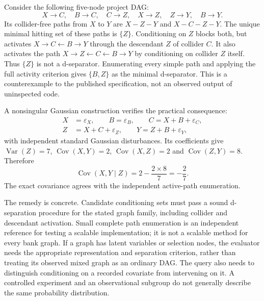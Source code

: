 Consider the following five-node project DAG:
\begin{equation}
 X\to C,\quad B\to C,\quad C\to Z,\quad X\to Z,
 \quad Z\to Y,\quad B\to Y.
\label{exec17:validity-graph}
\end{equation}
Its collider-free paths from $X$ to $Y$ are $X-Z-Y$ and $X-C-Z-Y$. The unique
minimal hitting set of these paths is $\{Z\}$. Conditioning on $Z$ blocks
both, but activates $X\to C\leftarrow B\to Y$ through the descendant
$Z$ of collider $C$. It also activates the path
$X\to Z\leftarrow C\leftarrow B\to Y$ by conditioning on collider $Z$
itself. Thus $\{Z\}$ is not a d-separator. Enumerating every simple path
and applying the full activity criterion gives $\{B,Z\}$ as the minimal
d-separator. This is a counterexample to the published specification, not an
observed output of uninspected code.~\citep{exec17_advice_validity_exact}

A nonsingular Gaussian construction verifies the practical consequence:
\begin{equation}
\begin{split}
 X&=\varepsilon_X,\qquad B=\varepsilon_B,\qquad
 C=X+B+\varepsilon_C,\\
 Z&=X+C+\varepsilon_Z,\qquad Y=Z+B+\varepsilon_Y,
\end{split}
\label{exec17:validity-opened-scm}
\end{equation}
with independent standard Gaussian disturbances. Its coefficients give
$\operatorname{Var}(Z)=7$, $\operatorname{Cov}(X,Y)=2$,
$\operatorname{Cov}(X,Z)=2$ and $\operatorname{Cov}(Z,Y)=8$. Therefore
\begin{equation}
 \operatorname{Cov}(X,Y\mid Z)=2-\frac{2\times8}{7}=-\frac27.
\label{exec17:validity-opened-covariance}
\end{equation}
The exact covariance agrees with the independent active-path enumeration.
\citep{exec17_advice_validity_exact}

The remedy is concrete. Candidate conditioning sets must pass a sound
d-separation procedure for the stated graph family, including collider and
descendant activation. Small complete path enumeration is an independent
reference for testing a scalable implementation; it is not a scalable method
for every bank graph. If a graph has latent variables or selection nodes, the
evaluator needs the appropriate representation and separation criterion,
rather than treating its observed mixed graph as an ordinary DAG. The query
also needs to distinguish conditioning on a recorded covariate from
intervening on it. A controlled experiment and an observational subgroup do
not generally describe the same probability distribution.

